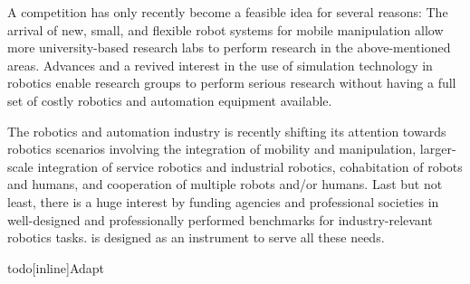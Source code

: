 \clearpage

A \RCAW competition has only recently become a feasible idea for several reasons: The arrival of new, small, and flexible robot systems for mobile manipulation allow more university-based research labs to perform research in the above-mentioned areas. Advances and a revived interest in the use of simulation technology in robotics enable research groups to perform serious research without having a full set of costly robotics and automation equipment available.
\par

The robotics and automation industry is recently shifting its attention towards robotics scenarios involving the integration of mobility and manipulation, larger-scale integration of service robotics and industrial robotics, cohabitation of robots and humans, and cooperation of multiple robots and/or humans. Last but not least, there is a huge interest by funding agencies and professional societies in well-designed and professionally performed benchmarks for industry-relevant robotics tasks. \RCAW is designed as an instrument to serve all these needs.
\par
todo[inline]{Adapt}

